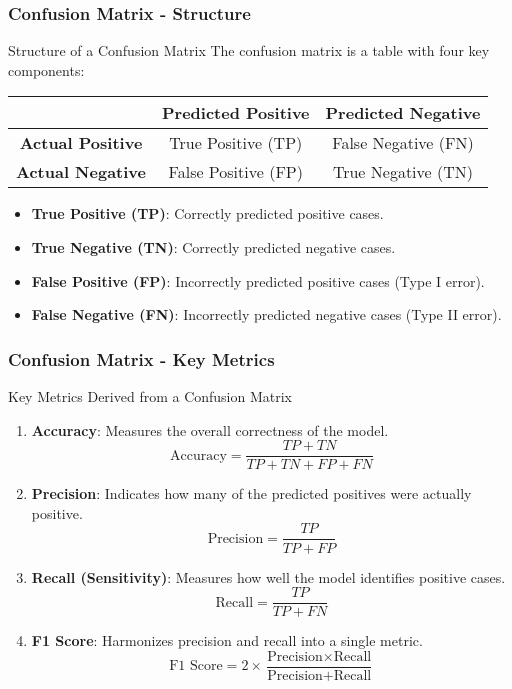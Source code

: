 \documentclass[aspectratio=169]{beamer}
\begin{document}
\begin{frame}[fragile]
    \frametitle{Confusion Matrix - Structure}
    \begin{block}{Structure of a Confusion Matrix}
        The confusion matrix is a table with four key components:
        \begin{center}
            \begin{tabular}{|c|c|c|}
                \hline
                & \textbf{Predicted Positive} & \textbf{Predicted Negative} \\
                \hline
                \textbf{Actual Positive} & True Positive (TP) & False Negative (FN) \\
                \hline
                \textbf{Actual Negative} & False Positive (FP) & True Negative (TN) \\
                \hline
            \end{tabular}
        \end{center}
        \begin{itemize}
            \item \textbf{True Positive (TP)}: Correctly predicted positive cases.
            \item \textbf{True Negative (TN)}: Correctly predicted negative cases.
            \item \textbf{False Positive (FP)}: Incorrectly predicted positive cases (Type I error).
            \item \textbf{False Negative (FN)}: Incorrectly predicted negative cases (Type II error).
        \end{itemize}
    \end{block}
\end{frame}

\begin{frame}[fragile]
    \frametitle{Confusion Matrix - Key Metrics}
    \begin{block}{Key Metrics Derived from a Confusion Matrix}
        \begin{enumerate}
            \item \textbf{Accuracy}: Measures the overall correctness of the model.
            \[
            \text{Accuracy} = \frac{TP + TN}{TP + TN + FP + FN}
            \]
            \item \textbf{Precision}: Indicates how many of the predicted positives were actually positive.
            \[
            \text{Precision} = \frac{TP}{TP + FP}
            \]
            \item \textbf{Recall (Sensitivity)}: Measures how well the model identifies positive cases.
            \[
            \text{Recall} = \frac{TP}{TP + FN}
            \]
            \item \textbf{F1 Score}: Harmonizes precision and recall into a single metric.
            \[
            \text{F1 Score} = 2 \times \frac{\text{Precision} \times \text{Recall}}{\text{Precision} + \text{Recall}}
            \]
        \end{enumerate}
    \end{block}
\end{frame}
\end{document}

